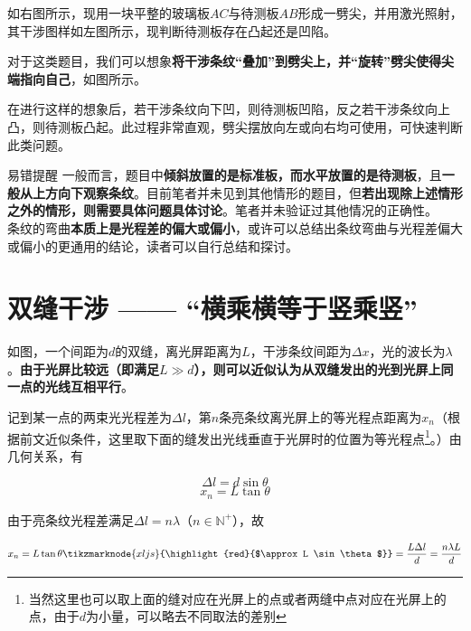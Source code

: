 

如右图所示，现用一块平整的玻璃板$AC$与待测板$AB$形成一劈尖，并用激光照射，其干涉图样如左图所示，现判断待测板存在凸起还是凹陷。

对于这类题目，我们可以想象\textbf{将干涉条纹“叠加”到劈尖上，并“旋转”劈尖使得尖端指向自己}，如图所示。



在进行这样的想象后，若干涉条纹向下凹，则待测板凹陷，反之若干涉条纹向上凸，则待测板凸起。此过程非常直观，劈尖摆放向左或向右均可使用，可快速判断此类问题。

\begin{mk}{易错提醒}{}
一般而言，题目中\textbf{倾斜放置的是标准板，而水平放置的是待测板}，且\textbf{一般从上方向下观察条纹}。目前笔者并未见到其他情形的题目，但\textbf{若出现除上述情形之外的情形，则需要具体问题具体讨论}。笔者并未验证过其他情况的正确性。
~\\

条纹的弯曲\textbf{本质上是光程差的偏大或偏小}，或许可以总结出条纹弯曲与光程差偏大或偏小的更通用的结论，读者可以自行总结和探讨。
\end{mk}

\section{双缝干涉 —— “横乘横等于竖乘竖”}



如图，一个间距为$d$的双缝，离光屏距离为$L$，干涉条纹间距为$\Delta x$，光的波长为$\lambda$。\textbf{由于光屏比较远（即满足$L \gg d$），则可以近似认为从双缝发出的光到光屏上同一点的光线互相平行}。

记到某一点的两束光光程差为$\Delta l$，第$n$条亮条纹离光屏上的等光程点距离为$x_n$（根据前文近似条件，这里取下面的缝发出光线垂直于光屏时的位置为等光程点\footnote{当然这里也可以取上面的缝对应在光屏上的点或者两缝中点对应在光屏上的点，由于$d$为小量，可以略去不同取法的差别}。）由几何关系，有

$$ \Delta l = d \sin \theta $$
$$ x_n = L \tan \theta $$

由于亮条纹光程差满足$\Delta l = n \lambda$（$n \in \mathbb{N^{+}}$），故

\begin{subequations}
\begin{align*}
x_n = L \tan \theta \tikzmarknode{xljs}{\highlight{red}{$\approx L \sin \theta$}} = \frac{L \Delta l}{d} = \frac{n \lambda L}{d}
\end{align*}
\end{subequations}

